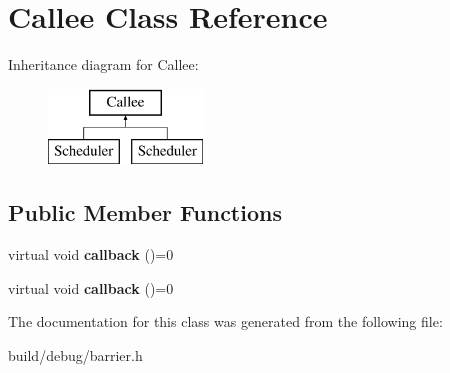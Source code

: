 \hypertarget{classCallee}{\section{Callee Class Reference}
\label{classCallee}
}
Inheritance diagram for Callee\-:\begin{figure}[H]
\begin{center}
\leavevmode
\includegraphics[height=2.000000cm]{classCallee}
\end{center}
\end{figure}
\subsection*{Public Member Functions}
\begin{DoxyCompactItemize}
\item 
\hypertarget{classCallee_a9224b75c8810dcdd2b8eefec4767d151}{virtual void {\bfseries callback} ()=0}\label{classCallee_a9224b75c8810dcdd2b8eefec4767d151}

\item 
\hypertarget{classCallee_a9224b75c8810dcdd2b8eefec4767d151}{virtual void {\bfseries callback} ()=0}\label{classCallee_a9224b75c8810dcdd2b8eefec4767d151}

\end{DoxyCompactItemize}


The documentation for this class was generated from the following file\-:\begin{DoxyCompactItemize}
\item 
build/debug/barrier.\-h\end{DoxyCompactItemize}
